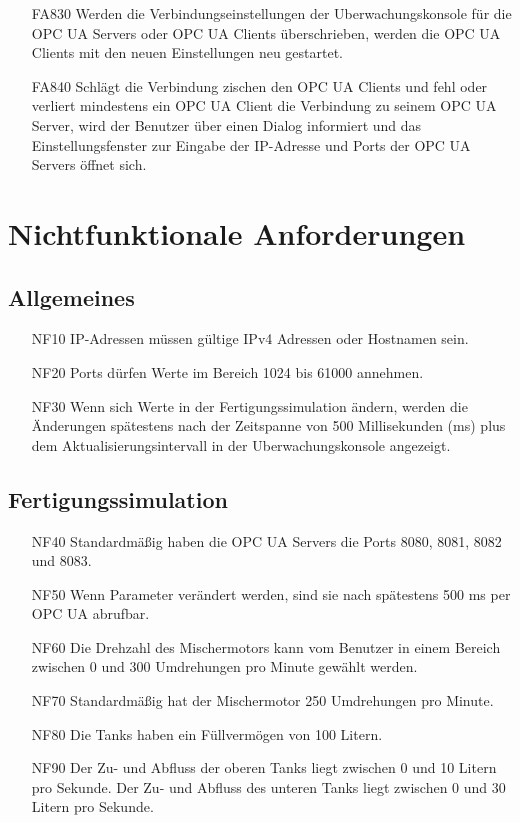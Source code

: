 \documentclass[parskip=full]{scrartcl}
\begin{document}
\begin{enumerate}
  \item[FA830] Werden die Verbindungseinstellungen der \gls{Uberwachungskonsole} für die \glspl{OPC UA Server} oder \glspl{OPC UA Client} überschrieben, werden die \glspl{OPC UA Client} mit den neuen Einstellungen neu gestartet.
  \item[FA840] Schlägt die Verbindung zischen den \glspl{OPC UA Client} und  fehl oder verliert mindestens ein \gls{OPC UA Client} die Verbindung zu seinem \gls{OPC UA Server}, wird
    der Benutzer über einen Dialog informiert und das Einstellungsfenster zur Eingabe der \gls{IP-Adresse} und Ports der \glspl{OPC UA Server} öffnet sich.
\end{enumerate}

\pagebreak
\section{Nichtfunktionale Anforderungen}
\subsection{Allgemeines}
\begin{enumerate}
  \item[NF10] IP-Adressen müssen gültige IPv4 Adressen oder Hostnamen sein.
  \item[NF20] Ports dürfen Werte im Bereich 1024 bis 61000 annehmen.
  \item[NF30] Wenn sich Werte in der \gls{Fertigungssimulation} ändern, werden die Änderungen spätestens nach der Zeitspanne von 500 Millisekunden (ms) plus dem Aktualisierungsintervall in der \gls{Uberwachungskonsole} angezeigt.
\end{enumerate}

\subsection{Fertigungssimulation}
\begin{enumerate}
  \item[NF40] Standardmäßig haben die \glspl{OPC UA Server} die Ports 8080, 8081, 8082 und 8083.
  \item[NF50] Wenn Parameter verändert werden, sind sie nach spätestens 500 ms per \gls{OPC UA} abrufbar.
  \item[NF60] Die Drehzahl des Mischermotors kann vom Benutzer in einem Bereich zwischen 0 und 300 Umdrehungen pro Minute gewählt werden.
  \item[NF70] Standardmäßig hat der Mischermotor 250 Umdrehungen pro Minute.
  \item[NF80] Die Tanks haben ein Füllvermögen von 100 Litern.
  \item[NF90] Der Zu- und Abfluss der oberen Tanks liegt zwischen 0 und 10 Litern pro Sekunde. Der Zu- und Abfluss des unteren Tanks liegt zwischen 0 und 30 Litern pro Sekunde.
\end{enumerate}
\end{document}
